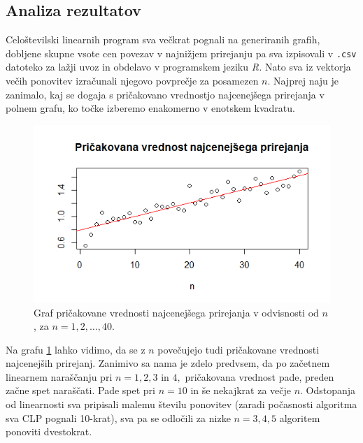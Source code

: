 \documentclass[a4paper, 11pt]{article}
\begin{document}
\subsection{Analiza rezultatov}
Celoštevilski linearnih program sva večkrat pognali na generiranih grafih, dobljene skupne vsote cen povezav v najnižjem prirejanju pa sva izpisovali v \texttt{.csv} datoteko za lažji uvoz in obdelavo v programskem jeziku \emph{R.}
Nato sva iz vektorja večih ponovitev izračunali njegovo povprečje za posamezen $n$.
Najprej naju je zanimalo, kaj se dogaja s pričakovano vrednostjo najcenejšega prirejanja v polnem grafu, ko točke izberemo enakomerno v enotskem kvadratu.

\begin{figure}[h!]
    \includegraphics[scale=0.6]{pricak_vred_n_od_1_do_40}
    \centering
    \caption{Graf pričakovane vrednosti najcenejšega prirejanja v odvisnosti od $n$, za $n=1,2,\ldots,40$.}
    \label{fig:pv1-40}
\end{figure}

Na grafu \ref{fig:pv1-40} lahko vidimo, da se z $n$ povečujejo tudi pričakovane vrednosti najcenejših prirejanj.
Zanimivo sa nama je zdelo predvsem, da po začetnem linearnem naraščanju pri $n=1,2,3$ in $4,$ pričakovana vrednost pade, preden začne spet naraščati.
Pade spet pri $n=10$ in še nekajkrat za večje $n.$
Odstopanja od linearnosti sva pripisali malemu številu ponovitev (zaradi počasnosti algoritma sva CLP pognali 10-krat), sva pa se odločili za nizke $n=3,4,5$ algoritem ponoviti dvestokrat.
\end{document}
